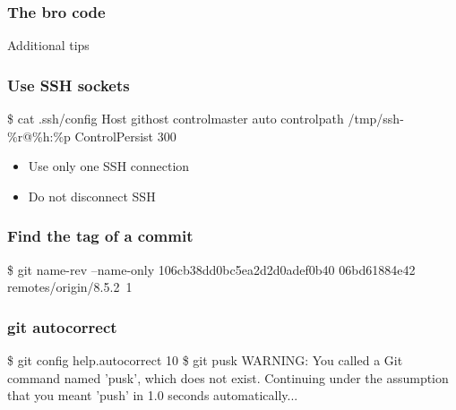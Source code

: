 \begin{frame}\frametitle{The bro code}\begin{center}
    \Huge {}
\end{center}
\end{frame}


\begin{frame}
    \begin{center}
        \Huge{Additional tips}
    \end{center}
\end{frame}
\begin{frame}[fragile]
    \frametitle{Use SSH sockets}
\begin{block}{}\begin{semiverbatim}
\$ cat {}.ssh/config
Host githost
    controlmaster auto
    controlpath /tmp/ssh-\%r@\%h:\%p
    ControlPersist 300
\end{semiverbatim}\end{block}
    \begin{itemize}
        \item Use only one SSH connection
        \item Do not disconnect SSH
    \end{itemize}
\end{frame}
\begin{frame}[fragile]
    \frametitle{Find the tag of a commit}

\begin{block}{}\begin{semiverbatim}
\$ git name-rev --name-only 106cb38dd0bc5ea2d2d0adef0b40
06bd61884e42
\color{lightgrey}remotes/origin/8.5.2~1
\end{semiverbatim}\end{block}
\end{frame}
\begin{frame}[fragile]
    \frametitle{git autocorrect}
\begin{block}{}\begin{semiverbatim}
\$ git config help.autocorrect 10\pause
\$ git pusk
\color{lightgrey}WARNING: You called a Git command named \rq{}pusk\rq{}, which does not exist.
Continuing under the assumption that you meant \rq{}push\rq{}
in 1.0 seconds automatically.{}.{}.
\end{semiverbatim}\end{block}
\end{frame}
